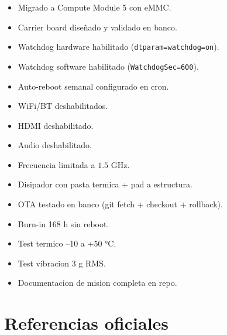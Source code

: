 \documentclass[11pt,a4paper,oneside]{report}
\begin{document}
\begin{itemize}[leftmargin=2em]
  \item[$\square$] Migrado a Compute Module 5 con eMMC.
  \item[$\square$] Carrier board diseñado y validado en banco.
  \item[$\square$] Watchdog hardware habilitado (\texttt{dtparam=watchdog=on}).
  \item[$\square$] Watchdog software habilitado (\texttt{WatchdogSec=600}).
  \item[$\square$] Auto-reboot semanal configurado en cron.
  \item[$\square$] WiFi/BT deshabilitados.
  \item[$\square$] HDMI deshabilitado.
  \item[$\square$] Audio deshabilitado.
  \item[$\square$] Frecuencia limitada a $1.5$ GHz.
  \item[$\square$] Disipador con pasta termica + pad a estructura.
  \item[$\square$] OTA testado en banco (git fetch + checkout + rollback).
  \item[$\square$] Burn-in 168 h sin reboot.
  \item[$\square$] Test termico --10 a +50 °C.
  \item[$\square$] Test vibracion 3 g RMS.
  \item[$\square$] Documentacion de mision completa en repo.
\end{itemize}

\chapter*{Referencias oficiales}
\end{document}
